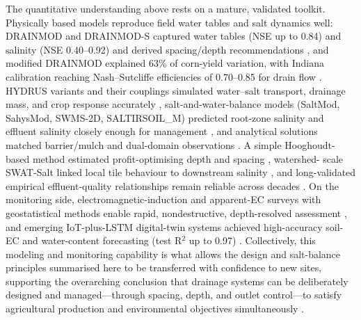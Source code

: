 The quantitative understanding above rests on a mature, validated toolkit.
Physically based models reproduce field water tables and salt dynamics well:
DRAINMOD and DRAINMOD-S captured water tables (NSE up to 0.84) and salinity (NSE
0.40--0.92) and derived spacing/depth recommendations
\parencite{Chen2025,Tian2023,Tian2023c,Tian2024,Davoodi2019,Li2024}, and modified
DRAINMOD explained 63\% of corn-yield variation, with Indiana calibration reaching
Nash--Sutcliffe efficiencies of 0.70--0.85 for drain flow
\parencite{HARDJOAMIDJOJO1982,Ale2009,Wang2006b,DeBoer2006}. HYDRUS variants and
their couplings simulated water--salt transport, drainage mass, and crop response
accurately \parencite{Li2023,Dou2022,Wang2024c,Li2026,Jia2023,Liu2022,Feng2019,Feng2021},
salt-and-water-balance models (SaltMod, SahysMod, SWMS-2D, SALTIRSOIL\_M) predicted
root-zone salinity and effluent salinity closely enough for management
\parencite{Bahçeci2006,Bahçeci2007,Yao2017,Qian2021b,Abdelkrim2021}, and analytical
solutions matched barrier/mulch and dual-domain observations
\parencite{KAMRA1991,KAMRA1994,Zhang2022,Zhang2024,Youngs2000}. A simple
Hooghoudt-based method estimated profit-optimising depth and spacing
\parencite{Skaggs2006,HOOGHOUDT1952,KARAJEH1994,KARAJEH1994b,Sands2015}, watershed-
scale SWAT-Salt linked local tile behaviour to downstream salinity
\parencite{Addab2022,Liu2026,ElAgha2020}, and long-validated empirical
effluent-quality relationships remain reliable across decades
\parencite{JOHNSTON1993,Kelleners2000}. On the monitoring side,
electromagnetic-induction and apparent-EC surveys with geostatistical methods
enable rapid, nondestructive, depth-resolved assessment
\parencite{Narjary2024,Song2023,Yu2025,Singh2020d,Mirlas2003,Gates2002}, and
emerging IoT-plus-LSTM digital-twin systems achieved high-accuracy soil-EC and
water-content forecasting (test R$^2$ up to 0.97) \parencite{Qin2025}.
Collectively, this modeling and monitoring capability is what allows the design
and salt-balance principles summarised here to be transferred with confidence to
new sites, supporting the overarching conclusion that drainage systems can be
deliberately designed and managed---through spacing, depth, and outlet
control---to satisfy agricultural production and environmental objectives
simultaneously \parencite{Skaggs1995,Breve1998,ElSadek2002b,Strock2011,Ritzema2016,Blann2009,Gramlich2018,FAUSEY1995,SKAGGS1994}.